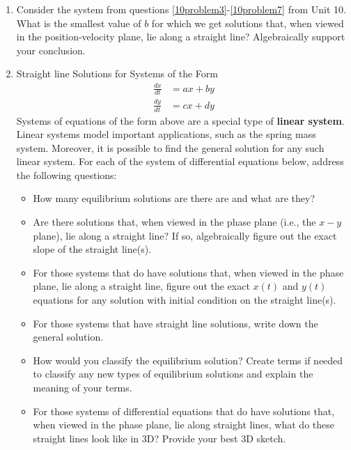 \begin{enumerate}
\item Consider the system from questions \ref{10problem3}-\ref{10problem7} from Unit 10. What is the smallest value of $b$ for which we get solutions that, when viewed in the position-velocity plane, lie along a straight line? Algebraically support your conclusion. \label{10HWproblem1}

\item Straight line Solutions for Systems of the Form 
\begin{align*}
\frac{dx}{dt}&=ax+by\\
\frac{dy}{dt}&=cx+dy
\end{align*}
Systems of equations of the form above are a special type of \textbf{linear system}. Linear systems model important applications, such as the spring mass system. Moreover, it is possible to find the general solution for any such linear system. For each of the system of differential equations below, address the following questions: \label{10HWproblem2}
\begin{itemize}

\item	How many equilibrium solutions are there are and what are they?

\item	Are there solutions that, when viewed in the phase plane (i.e., the $ x-y$ plane), lie along a straight line? If so, algebraically figure out the exact slope of the straight line(s). 

\item	For those systems that do have solutions that, when viewed in the phase plane, lie along a straight line, figure out the exact $x(t)$ and $y(t)$ equations for any solution with initial condition on the straight line(s). 

\item	For those systems that have straight line solutions, write down the general solution.

\item	How would you classify the equilibrium solution? Create terms if needed to classify any new types of equilibrium solutions and explain the meaning of your terms.

\item	For those systems of differential equations that do have solutions that, when viewed in the phase plane, lie along straight lines, what do these straight lines look like in 3D? Provide your best 3D sketch.


\end{itemize}
\end{enumerate}
